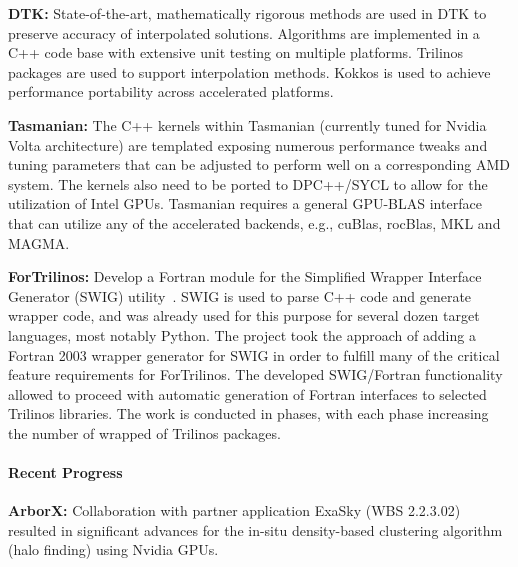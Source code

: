 {\bf DTK:} State-of-the-art, mathematically rigorous methods are used in DTK
to preserve accuracy of interpolated solutions.  Algorithms are implemented in
a C++ code base with extensive unit testing on multiple platforms.  Trilinos
packages are used to support interpolation methods.  Kokkos is used to achieve
performance portability across accelerated platforms.

{\bf Tasmanian:} The C++ kernels within Tasmanian (currently tuned for Nvidia
Volta architecture) are templated exposing numerous performance tweaks and
tuning parameters that can be adjusted to perform well on a corresponding AMD
system.
The kernels also need to be ported to DPC++/SYCL to allow for the utilization
of Intel GPUs. Tasmanian requires a general GPU-BLAS interface that can
utilize any of the accelerated backends, e.g., cuBlas, rocBlas, MKL and MAGMA.

{\bf ForTrilinos:} Develop a Fortran module for the Simplified Wrapper
Interface Generator (SWIG) utility~\cite{beazley1996swig}. SWIG is used to parse
C++ code and generate wrapper code, and was already used for this purpose for
several dozen target languages, most notably Python. The project took the
approach of adding a Fortran 2003 wrapper generator for SWIG in order to
fulfill many of the critical feature requirements for ForTrilinos.
The developed SWIG/Fortran functionality allowed to proceed with automatic
generation of Fortran interfaces to selected Trilinos libraries. The work is
conducted in phases, with each phase increasing the number of wrapped of
Trilinos packages.


\paragraph{Recent Progress}

\indent

{\bf ArborX:} Collaboration with partner application ExaSky (WBS 2.2.3.02)
resulted in significant advances for the in-situ density-based clustering
algorithm (halo finding) using Nvidia GPUs.

